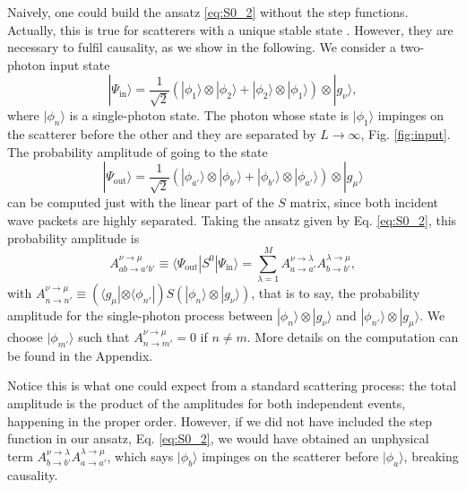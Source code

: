 \documentclass[aps,pra,reprint,amsmath,amssymb]{revtex4-1}
\begin{document}
Naively, one could build the ansatz \eqref{eq:S0_2} without the step functions. Actually, this is true for scatterers with a unique stable state \cite{Xu2013}. However, they are necessary to fulfil causality, as we show in the following. We consider a two-photon input state
\begin{equation}\label{eq:input}
|\Psi_\text{in}\rangle = \frac{1}{\sqrt{2}}(|\phi_1\rangle \otimes|\phi_2\rangle + |\phi_2\rangle\otimes |\phi_1\rangle)\otimes|g_\nu\rangle,
\end{equation}
where $|\phi_n\rangle$ is a single-photon state. The photon whose state is $|\phi_1\rangle$ impinges on the scatterer before the other and they are separated by $L\to\infty$, Fig. \ref{fig:input}. The probability amplitude of going to the state
\begin{equation}
|\Psi_\text{out}\rangle = \frac{1}{\sqrt{2}}(|\phi_{a'}\rangle \otimes|\phi_{b'}\rangle + |\phi_{b'}\rangle\otimes |\phi_{a'}\rangle)\otimes|g_\mu\rangle
\end{equation}
can be computed just with the linear part of the $S$ matrix, since both incident wave packets are highly separated. Taking the ansatz given by Eq. \eqref{eq:S0_2}, this probability amplitude is
\begin{equation}\label{eq:A}
A_{ab\to a'b'}^{\nu\to\mu} \equiv \langle \Psi_\text{out}|S^0|\Psi_\text{in}\rangle =  \sum_{\lambda=1}^M A_{a\to a'}^{\nu\to\lambda} A_{b\to b'}^{\lambda\to\mu},
\end{equation}
with $A_{n\to n'}^{\nu\to \mu}\equiv (\langle g_\mu |\otimes \langle \phi_{n'}|)S(|\phi_n\rangle\otimes |g_\nu\rangle)$, that is to say, the probability amplitude for the single-photon process between $|\phi_n\rangle\otimes |g_\nu\rangle$ and $|\phi_{n'}\rangle\otimes |g_\mu\rangle$. We choose $|\phi_{m'}\rangle$ such that $A_{n\to m'}^{\nu\to \mu}=0$ if $n\neq m$. More details on the computation can be found in the Appendix.

Notice this is what one could expect from a standard scattering process: the total amplitude is the product of the amplitudes for both independent events, happening in the proper order. However, if we did not have included the step function in our ansatz, Eq. \eqref{eq:S0_2}, we would have obtained an unphysical term $A_{b\to b'}^{\nu\to\lambda} A_{a\to a'}^{\lambda\to\mu}$, which says $|\phi_b\rangle$ impinges on the scatterer before $|\phi_a\rangle$, breaking causality.
\end{document}
